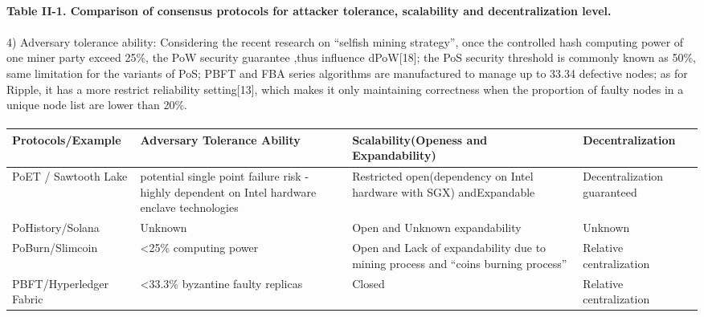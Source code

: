 \documentclass[doublespacing]{bmcart}
\begin{document}
\begin{CJK*}{UTF8}{gbsn}
\paragraph{Table II-1. Comparison of consensus protocols for attacker tolerance, scalability and decentralization level.}
	\paragraph{} 
4) Adversary tolerance ability:
Considering the recent research on ``selfish mining strategy'', once the controlled hash computing power of one miner party exceed 25\%, the PoW security guarantee ,thus influence dPoW[18]; the PoS security threshold is commonly known as 50\%, same limitation for the variants of PoS; PBFT and FBA series algorithms are manufactured to manage up to 33.34 defective nodes; as for Ripple, it has a more restrict reliability setting[13], which makes it only maintaining correctness when the
proportion of faulty nodes in a unique node list are
lower than 20\%.
  
\paragraph{}
  \begin{tabular}{p{2cm}p{3cm}p{3cm}p{3cm}}
  \hline
 Protocols/E\-xample  & 
Adversary Tolerance Ability & 
Scalability(Openess and Expandability) & Decentralization \\ \hline
PoET / Sawtooth Lake 
 & potential single point failure risk - highly dependent on Intel hardware enclave technologies  
 & Restricted open(dependency on Intel hardware with SGX) and\newline Expandable 
 & Decentralization guaranteed\\ \hline
 
PoHistory/So\-lana 
& Unknown 
& Open and \newline Unknown expandability 
& Unknown \\ \hline

PoBurn/\newline Slimcoin 
& \textless25\% computing power 
& Open and \newline Lack of expandability due to mining process and ``coins burning process'' 
& Relative centralization \\ \hline

PBFT/Hyp\-erledger Fabric
& \textless33.3\% byzantine faulty replicas 
& Closed 
& Relative centralization \\ \hline


\end{tabular}
\end{CJK*}
\end{document}
